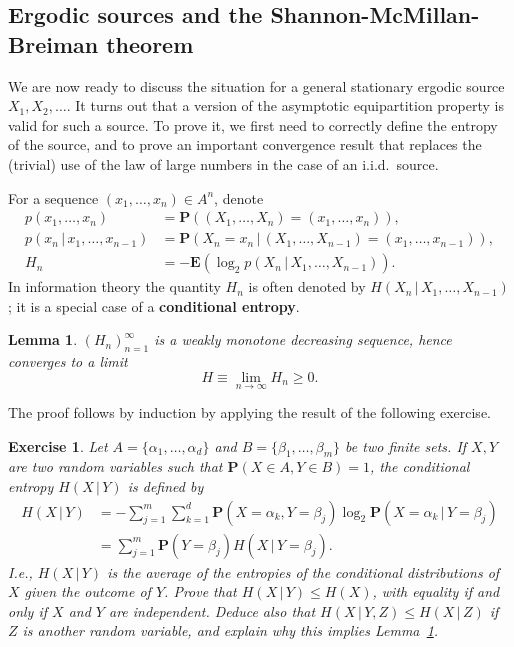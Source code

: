 \documentclass[12pt]{article}
\newtheorem{lem}[thm]{Lemma}
\newtheorem{exercise}[thm]{Exercise}
\newcommand{\prob}{\mathbf{P}}
\newcommand{\expec}{\mathbf{E}}
\theoremstyle{example}
\begin{document}
\subsection{Ergodic sources and the Shannon-McMillan-Breiman theorem}

We are now ready to discuss the situation for a general stationary ergodic source $X_1,X_2,\ldots$. It turns out that a version of the asymptotic equipartition property is valid for such a source. To prove it, we first need to correctly define the entropy of the source, and to prove an important convergence result that replaces the (trivial) use of the law of large numbers in the case of an i.i.d.\ source.

For a sequence $(x_1,\ldots,x_n)\in A^n$, denote 
\begin{align}
p(x_1,\ldots,x_n) &= \prob((X_1,\ldots,X_n)=(x_1,\ldots,x_n)), \label{eq:psymbols1} \\
p(x_n\,|\,x_1,\ldots,x_{n-1}) &= \prob(X_n=x_n\,|\,(X_1,\ldots,X_{n-1})=(x_1,\ldots,x_{n-1})), 
\label{eq:psymbols2} \\
H_n &= -\expec(\log_2 p(X_n\,|\,X_1,\ldots,X_{n-1})).
\label{eq:psymbols3}
\end{align}
In information theory the quantity $H_n$ is often denoted by $H(X_n\,|\, X_1,\ldots,X_{n-1})$; it is a special case of a \textbf{conditional entropy}.

\begin{lem} \label{lem-entropy-ergodic}
$(H_n)_{n=1}^\infty$ is a weakly monotone decreasing sequence, hence converges to a limit
\begin{equation} \label{eq:entropy-ergodic} 
H \equiv \lim_{n\to\infty} H_n \ge 0.
\end{equation}
\end{lem}

The proof follows by induction by applying the result of the following exercise.

\begin{exercise} Let $A=\{\alpha_1,\ldots,\alpha_d \}$ and $B=\{\beta_1,\ldots,\beta_m \}$ be two finite sets. If $X,Y$ are two random variables such that $\prob(X\in A, Y\in B)=1$, the conditional entropy $H(X\,|\,Y)$ is defined by
\begin{align*}
H(X\,|\,Y) &= -\sum_{j=1}^m \sum_{k=1}^d \prob(X=\alpha_k, Y=\beta_j) \log_2 \prob(X = \alpha_k\,|\,Y=\beta_j)
\\ &= \sum_{j=1}^m \prob(Y=\beta_j) H(X\,|\,Y=\beta_j).
\end{align*}
I.e., $H(X\,|\,Y)$ is the average of the entropies of the conditional distributions of $X$ given the outcome of $Y$. Prove that $H(X\,|\,Y) \le H(X)$, with equality if and only if $X$ and $Y$ are independent. Deduce also that $H(X\,|\,Y,Z) \le H(X\,|\,Z)$ if $Z$ is another random variable, and explain why this implies Lemma~\ref{lem-entropy-ergodic}.
\end{exercise}
\end{document}
